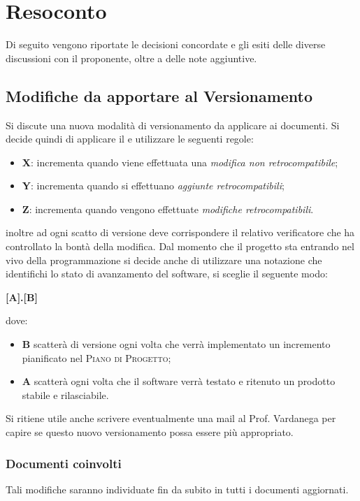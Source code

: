 \documentclass{article}
\begin{document}
\newpage
\section{Resoconto}
\label{sec:resoconto}

Di seguito vengono riportate le decisioni concordate e gli esiti delle diverse discussioni con il proponente, oltre a 
delle note aggiuntive.

\subsection{Modifiche da apportare al Versionamento}
\label{itm:1}

Si discute una nuova modalità di versionamento da applicare ai documenti. Si decide quindi di applicare il  e utilizzare le seguenti regole:
\begin{itemize}
    \item \textbf{X}: incrementa quando viene effettuata una \emph{modifica non retrocompatibile};
	\item \textbf{Y}: incrementa quando si effettuano \emph{aggiunte  retrocompatibili}; 
	\item \textbf{Z}: incrementa quando vengono effettuate \emph{modifiche retrocompatibili}.
\end{itemize}
inoltre ad ogni scatto di versione deve corrispondere il relativo verificatore che ha controllato la bontà della modifica.
Dal momento che il progetto sta entrando nel vivo della programmazione si decide anche di utilizzare una notazione che identifichi lo stato di avanzamento del software, si sceglie il seguente modo:
\begin{center}
    \textbf{[A].[B]}
\end{center}
dove:
\begin{itemize}
\item \textbf{B} scatterà di versione ogni volta che verrà implementato un incremento pianificato nel \textsc{Piano di Progetto}; 
\item \textbf{A} scatterà ogni volta che il software verrà testato e ritenuto un prodotto stabile e rilasciabile.
\end{itemize}
Si ritiene utile anche scrivere eventualmente una mail al Prof. Vardanega per capire se questo nuovo versionamento possa essere più appropriato.
\subsubsection*{Documenti coinvolti}
Tali modifiche saranno individuate fin da subito in tutti i documenti aggiornati.
\end{document}
